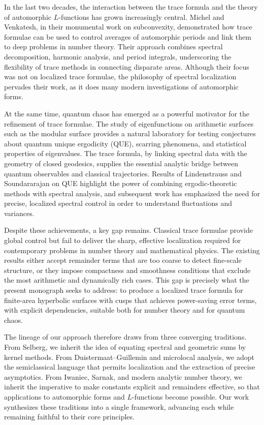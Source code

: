 In the last two decades, the interaction between the trace formula and the
theory of automorphic $L$-functions has grown increasingly central. Michel and
Venkatesh, in their monumental work on subconvexity, demonstrated how trace
formulae can be used to control averages of automorphic periods and link them
to deep problems in number theory. Their approach combines spectral
decomposition, harmonic analysis, and period integrals, underscoring the
flexibility of trace methods in connecting disparate areas. Although their
focus was not on localized trace formulae, the philosophy of spectral
localization pervades their work, as it does many modern investigations of
automorphic forms.

At the same time, quantum chaos has emerged as a powerful motivator for the
refinement of trace formulae. The study of eigenfunctions on arithmetic
surfaces such as the modular surface provides a natural laboratory for testing
conjectures about quantum unique ergodicity (QUE), scarring phenomena, and
statistical properties of eigenvalues. The trace formula, by linking spectral
data with the geometry of closed geodesics, supplies the essential analytic
bridge between quantum observables and classical trajectories. Results of
Lindenstrauss and Soundararajan on QUE highlight the power of combining
ergodic-theoretic methods with spectral analysis, and subsequent work has
emphasized the need for precise, localized spectral control in order to
understand fluctuations and variances.

Despite these achievements, a key gap remains. Classical trace formulae provide
global control but fail to deliver the sharp, effective localization required
for contemporary problems in number theory and mathematical physics. The
existing results either accept remainder terms that are too coarse to detect
fine-scale structure, or they impose compactness and smoothness conditions that
exclude the most arithmetic and dynamically rich cases. This gap is precisely
what the present monograph seeks to address: to produce a localized trace
formula for finite-area hyperbolic surfaces with cusps that achieves
power-saving error terms, with explicit dependencies, suitable both for number
theory and for quantum chaos.

The lineage of our approach therefore draws from three converging traditions.
From Selberg, we inherit the idea of equating spectral and geometric sums by
kernel methods. From Duistermaat–Guillemin and microlocal analysis, we adopt
the semiclassical language that permits localization and the extraction of
precise asymptotics. From Iwaniec, Sarnak, and modern analytic number theory,
we inherit the imperative to make constants explicit and remainders effective,
so that applications to automorphic forms and $L$-functions become possible.
Our work synthesizes these traditions into a single framework, advancing each
while remaining faithful to their core principles.

